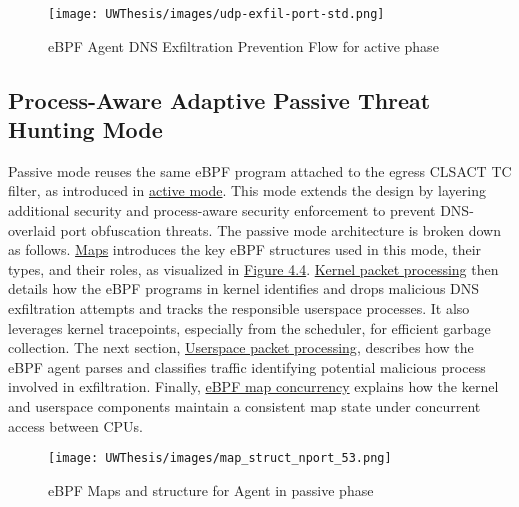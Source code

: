\documentclass [11pt, proquest] {uwthesis}[2020/02/24]
\begin{document}
\label{sec:data_plane_standard_port}
\begin{figure}[htbp]
    \texttt{[image: UWThesis/images/udp-exfil-port-std.png]}
\caption{eBPF Agent DNS Exfiltration Prevention Flow for active phase}
\label{sec:dp-active-phase}
\end{figure}

\subsection{Process-Aware Adaptive Passive Threat Hunting Mode}
\label{sec:passive}
Passive mode reuses the same eBPF program attached to the egress CLSACT TC filter, as introduced in \hyperref[sec:active]{active mode}. This mode extends the design by layering additional security and process-aware security enforcement to prevent DNS-overlaid port obfuscation threats.
The passive mode architecture is broken down as follows. \hyperref[sec:maps]{Maps} introduces the key eBPF structures used in this mode, their types, and their roles, as visualized in \hyperref[sec:dp_eBPF_LRU_Maps_passive]{Figure 4.4}. \hyperref[passive:sec1]{Kernel packet processing} then details how the eBPF programs in kernel identifies and drops malicious DNS exfiltration attempts and tracks the responsible userspace processes. It also leverages kernel tracepoints, especially from the scheduler, for efficient garbage collection. The next section, \hyperref[passive:sec2]{Userspace packet processing}, describes how the eBPF agent parses and classifies traffic identifying potential malicious process involved in exfiltration. Finally, \hyperref[passive:sec3]{eBPF map concurrency} explains how the kernel and userspace components maintain a consistent map state under concurrent access between CPUs.


\begin{figure}[H]
\centering
\texttt{[image: UWThesis/images/map\_struct\_nport\_53.png]}
\caption{eBPF Maps and structure for Agent in passive phase}
\label{sec:dp_eBPF_LRU_Maps_passive}
\end{figure}
\end{document}
